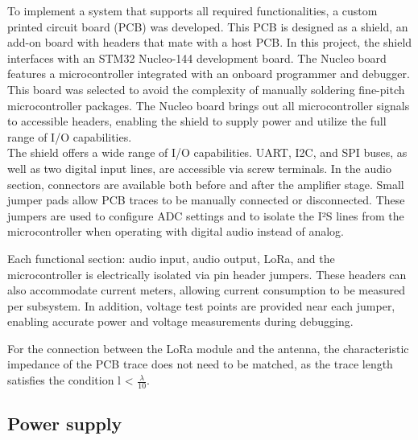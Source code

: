 

To implement a system that supports all required functionalities, a custom printed circuit board (PCB) was developed.
This PCB is designed as a shield, an add-on board with headers that mate with a host PCB.
In this project, the shield interfaces with an STM32 Nucleo-144 development board.
The Nucleo board features a microcontroller integrated with an onboard programmer and debugger.
This board was selected to avoid the complexity of manually soldering fine-pitch microcontroller packages.
The Nucleo board brings out all microcontroller signals to accessible headers, enabling the shield to supply power and utilize the full range of I/O capabilities.\\

The shield offers a wide range of I/O capabilities.
UART, I2C, and SPI buses, as well as two digital input lines, are accessible via screw terminals.
In the audio section, connectors are available both before and after the amplifier stage.
Small jumper pads allow PCB traces to be manually connected or disconnected. These jumpers are used to configure ADC settings and to isolate the I²S lines from the microcontroller when operating with digital audio instead of analog.

Each functional section: audio input, audio output, LoRa, and the microcontroller is electrically isolated via pin header jumpers.
These headers can also accommodate current meters, allowing current consumption to be measured per subsystem.
In addition, voltage test points are provided near each jumper, enabling accurate power and voltage measurements during debugging.

For the connection between the LoRa module and the antenna, the characteristic impedance of the PCB trace does not need to be matched, as the trace length satisfies the condition l < $\frac{\lambda}{10}$.

\subsection{Power supply}

